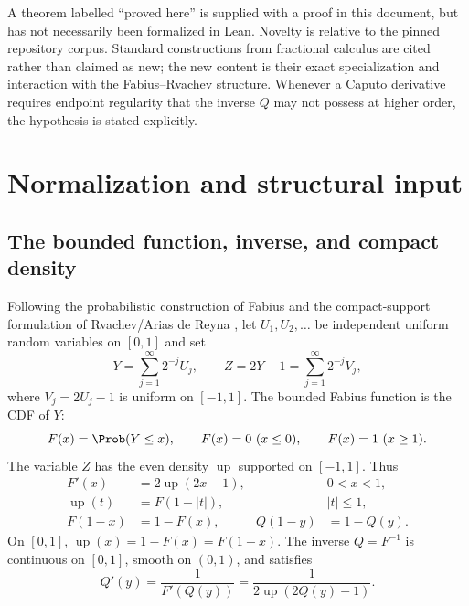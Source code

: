 \documentclass[11pt,oneside]{article}
\theoremstyle{definition}
\theoremstyle{remark}
\newcommand{\Up}{\operatorname{up}}
\newcommand{\1}{\mathbf 1}
\begin{document}
\begin{warningbox}
A theorem labelled ``proved here'' is supplied with a proof in this document,
but has not necessarily been formalized in Lean.  Novelty is relative to the
pinned repository corpus.  Standard constructions from fractional calculus
are cited rather than claimed as new; the new content is their exact
specialization and interaction with the Fabius--Rvachev structure.  Whenever
a Caputo derivative requires endpoint regularity that the inverse $Q$ may not
possess at higher order, the hypothesis is stated explicitly.
\end{warningbox}

\section{Normalization and structural input}
\label{p9:sec:normalization}

\subsection{The bounded function, inverse, and compact density}

Following the probabilistic construction of Fabius and the compact-support
formulation of Rvachev/Arias de Reyna \cite{p9:Fabius1966,p9:Arias1982,p9:Arias2017},
let $U_1,U_2,\ldots$ be independent uniform random variables on $[0,1]$ and
set
\begin{equation}
  Y=\sum_{j=1}^{\infty}2^{-j}U_j,
  \qquad
  Z=2Y-1=\sum_{j=1}^{\infty}2^{-j}V_j,
  \label{p9:eq:random-series}
\end{equation}
where $V_j=2U_j-1$ is uniform on $[-1,1]$.  The bounded Fabius function is the
CDF of $Y$:
\begin{equation}
 F(x)=\Prob(Y\le x),
 \qquad
 F(x)=0\ (x\le0),
 \qquad
 F(x)=1\ (x\ge1).
 \label{p9:eq:F-cdf}
\end{equation}
The variable $Z$ has the even density $\Up$ supported on $[-1,1]$.  Thus
\begin{align}
 F'(x)&=2\Up(2x-1), &&0<x<1,\label{p9:eq:Fprime-up}\\
 \Up(t)&=F(1-|t|), &&|t|\le1,\label{p9:eq:up-F}\\
 F(1-x)&=1-F(x),& Q(1-y)&=1-Q(y).\label{p9:eq:symmetry}
\end{align}
On $[0,1]$, $\Up(x)=1-F(x)=F(1-x)$.  The inverse
$Q=F^{-1}$ is continuous on $[0,1]$, smooth on $(0,1)$, and satisfies
\begin{equation}
 Q'(y)=\frac1{F'(Q(y))}
      =\frac1{2\Up(2Q(y)-1)}.
 \label{p9:eq:Qprime}
\end{equation}
\end{document}
